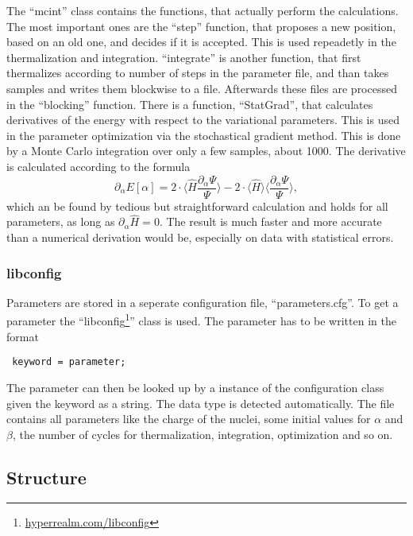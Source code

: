 \documentclass[a4paper,10pt]{article}
\begin{document}
The ``mcint'' class contains the functions, that actually perform the calculations. 
The most important ones are the ``step'' function, that proposes a new position, based on an old one, and decides if it is accepted. 
This is used repeadetly in the thermalization and integration. 
``integrate'' is another function, that first thermalizes according to number of steps in the parameter file, and than takes samples 
and writes them blockwise to a file. 
Afterwards these files are processed in the ``blocking'' function. 
There is a function, ``StatGrad'', that calculates derivatives of the energy with respect to the variational parameters. This is used in the
parameter optimization via the stochastical gradient method. This is done by a Monte Carlo integration over only a few samples, about 1000.
The derivative is calculated according to the formula
\begin{equation}
 \partial_{\alpha} E[\alpha] = 2 \cdot \Big\langle \hat{H} \frac{\partial_{\alpha} \Psi}{\Psi} \Big\rangle 
			       -2\cdot \Big\langle \hat{H} \Big\rangle \Big\langle \frac{\partial_{\alpha} \Psi}{\Psi} \Big\rangle,
\end{equation}
which an be found by tedious but straightforward calculation and holds for all parameters, as long as $\partial_{\alpha}\hat{H} =0$.
The result is much faster and more accurate than a numerical derivation would be, especially on
data with statistical errors. 




\subsubsection{libconfig}

Parameters are stored in a seperate configuration file, ``parameters.cfg''. 
To get a parameter the ``libconfig\footnote{\href{http://www.hyperrealm.com/libconfig/}{hyperrealm.com/libconfig}}'' class is used. The parameter has to be written in the format
\begin{lstlisting}
 keyword = parameter;
\end{lstlisting}
The parameter can then be looked up by a instance of the configuration class given the keyword as a string. The data type is detected automatically. 
The file contains all parameters like the charge of the nuclei, some initial values for $\alpha$ and $\beta$, 
the number of cycles for thermalization, integration, optimization and so on. 



\subsection{Structure}
\end{document}
